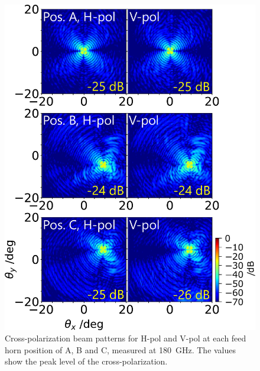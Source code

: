 \documentclass[journal]{IEEEtran}
\begin{document}
\begin{figure}[!t]
\centering
\includegraphics[width=\linewidth]{Figures/HVpol_Xpol_180G.pdf}
\caption{%
Cross-polarization beam patterns for H-pol and V-pol at each feed horn position of A, B and C, measured at 180~GHz. The values show the peak level of the cross-polarization.
}
\label{fig:HVpol_Xpol_180G}
\end{figure}
%
\end{document}
